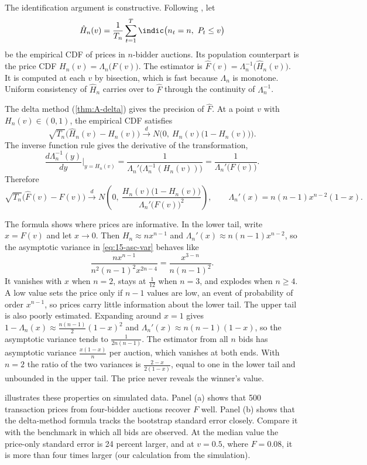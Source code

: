 The identification argument is constructive. Following \citet[Section~4.2]{AtheyHaile2007}, let
\[
\hat H_n(v)=\frac{1}{T_n}\sum_{t=1}^T\indic\big(n_t=n,\ P_t\le v\big)
\]
be the empirical CDF of prices in $n$-bidder auctions. Its population counterpart is the price CDF
$H_n(v)=\Lambda_n\big(F(v)\big)$. The estimator is $\hat F(v)=\Lambda_n^{-1}\big(\hat H_n(v)\big)$.
It is computed at each $v$ by bisection, which is fast because $\Lambda_n$ is monotone. Uniform
consistency of $\hat H_n$ carries over to $\hat F$ through the continuity of $\Lambda_n^{-1}$.

The delta method (\cref{thm:A-delta}) gives the precision of $\hat F$. At a point $v$ with $H_n(v)\in(0,1)$, the
empirical CDF satisfies
\[
\sqrt{T_n}\big(\hat H_n(v)-H_n(v)\big)\xrightarrow{d}N\Big(0,\ H_n(v)\big(1-H_n(v)\big)\Big).
\]
The inverse function rule gives the derivative of the transformation,
\[
\frac{d\Lambda_n^{-1}(y)}{dy}\bigg|_{y=H_n(v)}=\frac{1}{\Lambda_n'\big(\Lambda_n^{-1}(H_n(v))\big)}=\frac{1}{\Lambda_n'\big(F(v)\big)} .
\]
Therefore
\begin{equation}\label{eq:15-asc-var}
\sqrt{T_n}\big(\hat F(v)-F(v)\big)\xrightarrow{d}N\left(0,\ \frac{H_n(v)\big(1-H_n(v)\big)}{\Lambda_n'\big(F(v)\big)^2}\right),
\qquad \Lambda_n'(x)=n(n-1)x^{n-2}(1-x).
\end{equation}

The formula shows where prices are informative. In the lower tail, write $x=F(v)$ and let $x\to0$. Then
$H_n\approx nx^{n-1}$ and $\Lambda_n'(x)\approx n(n-1)x^{n-2}$, so the asymptotic variance in \eqref{eq:15-asc-var}
behaves like
\[
\frac{nx^{n-1}}{n^2(n-1)^2x^{2n-4}}=\frac{x^{3-n}}{n(n-1)^2}.
\]
It vanishes with $x$ when $n=2$, stays at $\frac{1}{12}$ when $n=3$, and explodes when $n\ge4$. A low value sets the
price only if $n-1$ values are low, an event of probability of order $x^{n-1}$, so prices carry little information
about the lower tail. The upper tail is also poorly estimated. Expanding around $x=1$ gives
$1-\Lambda_n(x)\approx\frac{n(n-1)}{2}(1-x)^2$ and $\Lambda_n'(x)\approx n(n-1)(1-x)$, so the asymptotic variance tends
to $\frac{1}{2n(n-1)}$. The estimator from all $n$ bids has asymptotic variance $\frac{x(1-x)}{n}$ per auction, which
vanishes at both ends. With $n=2$ the ratio of the two variances is $\frac{2-x}{2(1-x)}$, equal to one in the lower
tail and unbounded in the upper tail. The price never reveals the winner's value.

 illustrates these properties on simulated data. Panel (a) shows that 500 transaction prices
from four-bidder auctions recover $F$ well. Panel (b) shows that the delta-method formula tracks the bootstrap
standard error closely. Compare it with the benchmark in which all bids are observed. At the median value the
price-only standard error is 24 percent larger, and at $v=0.5$, where $F=0.08$, it is more than four times larger
(our calculation from the simulation).

